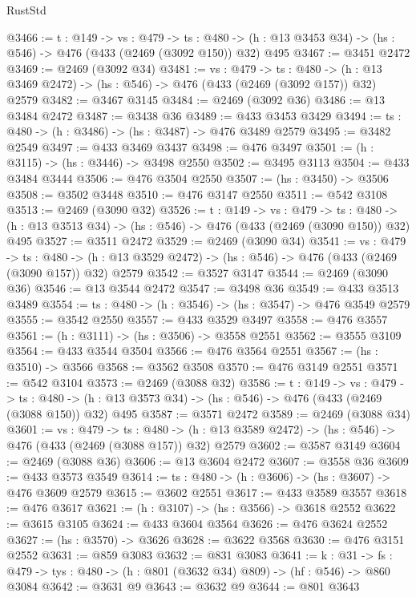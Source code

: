\begin{lexlean}{RustStd}
\begin{coremodule}
@3466 := {t : @149} ->
  {vs : @479} ->
  {ts : @480} -> (h : @13 @3453 @34) -> (hs : @546) -> @476 (@433 (@2469 (@3092 @150)) @32) @495
@3467 := @3451 @2472
@3469 := @2469 (@3092 @34)
@3481 := {vs : @479} ->
  {ts : @480} -> (h : @13 @3469 @2472) -> (hs : @546) -> @476 (@433 (@2469 (@3092 @157)) @32) @2579
@3482 := @3467 @3145
@3484 := @2469 (@3092 @36)
@3486 := @13 @3484 @2472
@3487 := @3438 @36
@3489 := @433 @3453 @3429
@3494 := {ts : @480} -> (h : @3486) -> (hs : @3487) -> @476 @3489 @2579
@3495 := @3482 @2549
@3497 := @433 @3469 @3437
@3498 := @476 @3497
@3501 := (h : @3115) -> (hs : @3446) -> @3498 @2550
@3502 := @3495 @3113
@3504 := @433 @3484 @3444
@3506 := @476 @3504 @2550
@3507 := (hs : @3450) -> @3506
@3508 := @3502 @3448
@3510 := @476 @3147 @2550
@3511 := @542 @3108
@3513 := @2469 (@3090 @32)
@3526 := {t : @149} ->
  {vs : @479} ->
  {ts : @480} -> (h : @13 @3513 @34) -> (hs : @546) -> @476 (@433 (@2469 (@3090 @150)) @32) @495
@3527 := @3511 @2472
@3529 := @2469 (@3090 @34)
@3541 := {vs : @479} ->
  {ts : @480} -> (h : @13 @3529 @2472) -> (hs : @546) -> @476 (@433 (@2469 (@3090 @157)) @32) @2579
@3542 := @3527 @3147
@3544 := @2469 (@3090 @36)
@3546 := @13 @3544 @2472
@3547 := @3498 @36
@3549 := @433 @3513 @3489
@3554 := {ts : @480} -> (h : @3546) -> (hs : @3547) -> @476 @3549 @2579
@3555 := @3542 @2550
@3557 := @433 @3529 @3497
@3558 := @476 @3557
@3561 := (h : @3111) -> (hs : @3506) -> @3558 @2551
@3562 := @3555 @3109
@3564 := @433 @3544 @3504
@3566 := @476 @3564 @2551
@3567 := (hs : @3510) -> @3566
@3568 := @3562 @3508
@3570 := @476 @3149 @2551
@3571 := @542 @3104
@3573 := @2469 (@3088 @32)
@3586 := {t : @149} ->
  {vs : @479} ->
  {ts : @480} -> (h : @13 @3573 @34) -> (hs : @546) -> @476 (@433 (@2469 (@3088 @150)) @32) @495
@3587 := @3571 @2472
@3589 := @2469 (@3088 @34)
@3601 := {vs : @479} ->
  {ts : @480} -> (h : @13 @3589 @2472) -> (hs : @546) -> @476 (@433 (@2469 (@3088 @157)) @32) @2579
@3602 := @3587 @3149
@3604 := @2469 (@3088 @36)
@3606 := @13 @3604 @2472
@3607 := @3558 @36
@3609 := @433 @3573 @3549
@3614 := {ts : @480} -> (h : @3606) -> (hs : @3607) -> @476 @3609 @2579
@3615 := @3602 @2551
@3617 := @433 @3589 @3557
@3618 := @476 @3617
@3621 := (h : @3107) -> (hs : @3566) -> @3618 @2552
@3622 := @3615 @3105
@3624 := @433 @3604 @3564
@3626 := @476 @3624 @2552
@3627 := (hs : @3570) -> @3626
@3628 := @3622 @3568
@3630 := @476 @3151 @2552
@3631 := @859 @3083
@3632 := @831 @3083
@3641 := {k : @31} ->
  {fs : @479} -> {tys : @480} -> (h : @801 (@3632 @34) @809) -> (hf : @546) -> @860 @3084
@3642 := @3631 @9
@3643 := @3632 @9
@3644 := @801 @3643

\end{coremodule}
\end{lexlean}
